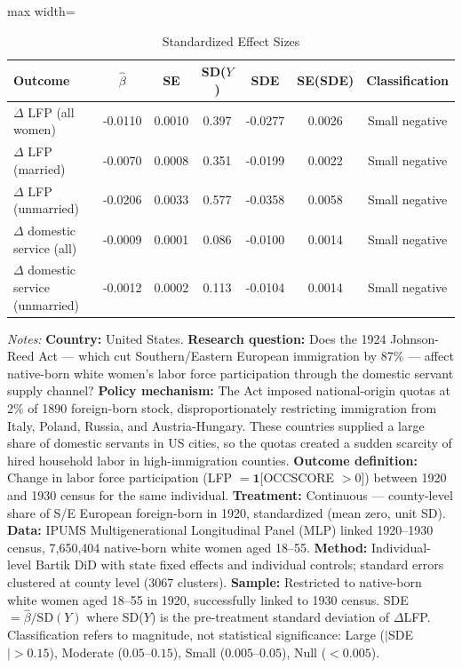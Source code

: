\begin{table}[htbp]
\centering
\caption{Standardized Effect Sizes}
\label{tab:sde}
\begin{adjustbox}{max width=\textwidth}
\begin{tabular}{lcccccc}
\hline\hline
Outcome & $\hat{\beta}$ & SE & SD($Y$) & SDE & SE(SDE) & Classification \\
\hline
$\Delta$ LFP (all women) & -0.0110 & 0.0010 & 0.397 & -0.0277 & 0.0026 & Small negative \\
$\Delta$ LFP (married) & -0.0070 & 0.0008 & 0.351 & -0.0199 & 0.0022 & Small negative \\
$\Delta$ LFP (unmarried) & -0.0206 & 0.0033 & 0.577 & -0.0358 & 0.0058 & Small negative \\
$\Delta$ domestic service (all) & -0.0009 & 0.0001 & 0.086 & -0.0100 & 0.0014 & Small negative \\
$\Delta$ domestic service (unmarried) & -0.0012 & 0.0002 & 0.113 & -0.0104 & 0.0014 & Small negative \\
\hline\hline
\end{tabular}
\end{adjustbox}
\begin{tablenotes}[flushleft]
\small
\item \textit{Notes:} \textbf{Country:} United States. \textbf{Research question:} Does the 1924 Johnson-Reed Act --- which cut Southern/Eastern European immigration by 87\% --- affect native-born white women's labor force participation through the domestic servant supply channel? \textbf{Policy mechanism:} The Act imposed national-origin quotas at 2\% of 1890 foreign-born stock, disproportionately restricting immigration from Italy, Poland, Russia, and Austria-Hungary. These countries supplied a large share of domestic servants in US cities, so the quotas created a sudden scarcity of hired household labor in high-immigration counties. \textbf{Outcome definition:} Change in labor force participation (LFP $= \mathbf{1}$[OCCSCORE $> 0$]) between 1920 and 1930 census for the same individual. \textbf{Treatment:} Continuous --- county-level share of S/E European foreign-born in 1920, standardized (mean zero, unit SD). \textbf{Data:} IPUMS Multigenerational Longitudinal Panel (MLP) linked 1920--1930 census, 7,650,404 native-born white women aged 18--55. \textbf{Method:} Individual-level Bartik DiD with state fixed effects and individual controls; standard errors clustered at county level (3067 clusters). \textbf{Sample:} Restricted to native-born white women aged 18--55 in 1920, successfully linked to 1930 census. SDE $= \hat{\beta} / \text{SD}(Y)$ where SD($Y$) is the pre-treatment standard deviation of $\Delta$LFP. Classification refers to magnitude, not statistical significance: Large ($|$SDE$| > 0.15$), Moderate ($0.05$--$0.15$), Small ($0.005$--$0.05$), Null ($< 0.005$).
\end{tablenotes}
\end{table}
